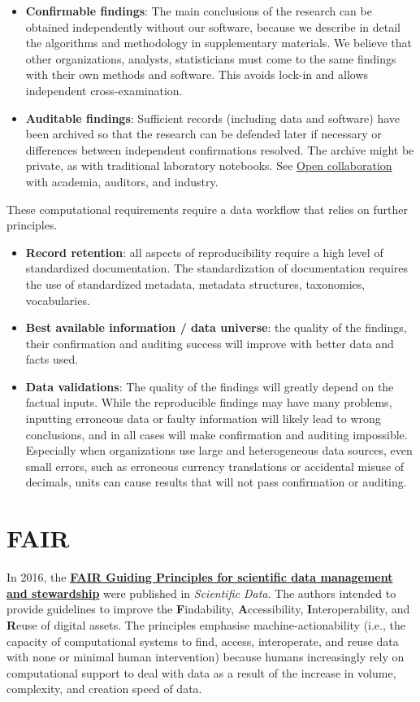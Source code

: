 \documentclass[
  a4paper,
  openany, a4paper, oneside]{book}
\begin{document}
\begin{itemize}
\item
  \textbf{Confirmable findings}: The main conclusions of the research can be obtained independently without our software, because we describe in detail the algorithms and methodology in supplementary materials. We believe that other organizations, analysts, statisticians must come to the same findings with their own methods and software. This avoids lock-in and allows independent cross-examination.
\item
  \textbf{Auditable findings}: Sufficient records (including data and software) have been archived so that the research can be defended later if necessary or differences between independent confirmations resolved. The archive might be private, as with traditional laboratory notebooks. See \protect\hyperlink{opencollaboration}{Open collaboration} with academia, auditors, and industry.
\end{itemize}

These computational requirements require a data workflow that relies on further principles.

\begin{itemize}
\item
  \textbf{Record retention}: all aspects of reproducibility require a high level of standardized documentation. The standardization of documentation requires the use of standardized metadata, metadata structures, taxonomies, vocabularies.
\item
  \textbf{Best available information / data universe}: the quality of the findings, their confirmation and auditing success will improve with better data and facts used.
\item
  \textbf{Data validations}: The quality of the findings will greatly depend on the factual inputs. While the reproducible findings may have many problems, inputting erroneous data or faulty information will likely lead to wrong conclusions, and in all cases will make confirmation and auditing impossible. Especially when organizations use large and heterogeneous data sources, even small errors, such as erroneous currency translations or accidental misuse of decimals, units can cause results that will not pass confirmation or auditing.
\end{itemize}

\hypertarget{fair}{%
\section{FAIR}\label{fair}}

In 2016, the \textbf{\href{http://www.nature.com/articles/sdata201618}{FAIR Guiding Principles for scientific data management and stewardship}} were published in \emph{Scientific Data}. The authors intended to provide guidelines to improve the \textbf{F}indability, \textbf{A}ccessibility, \textbf{I}nteroperability, and \textbf{R}euse of digital assets. The principles emphasise machine-actionability (i.e., the capacity of computational systems to find, access, interoperate, and reuse data with none or minimal human intervention) because humans increasingly rely on computational support to deal with data as a result of the increase in volume, complexity, and creation speed of data.
\end{document}
